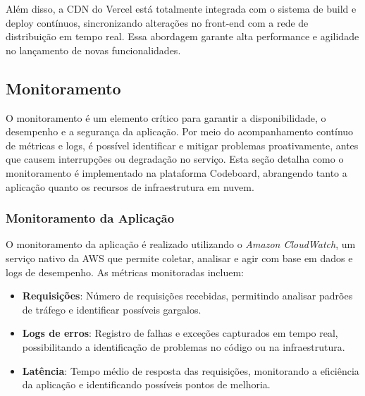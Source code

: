 Além disso, a CDN do Vercel está totalmente integrada com o sistema de build e deploy contínuos, sincronizando alterações no front-end com a rede de distribuição em tempo real. Essa abordagem garante alta performance e agilidade no lançamento de novas funcionalidades.


\subsection{Monitoramento}


O monitoramento é um elemento crítico para garantir a disponibilidade, o desempenho e a segurança da aplicação. Por meio do acompanhamento contínuo de métricas e logs, é possível identificar e mitigar problemas proativamente, antes que causem interrupções ou degradação no serviço. Esta seção detalha como o monitoramento é implementado na plataforma Codeboard, abrangendo tanto a aplicação quanto os recursos de infraestrutura em nuvem.

\subsubsection{Monitoramento da Aplicação}


O monitoramento da aplicação é realizado utilizando o \emph{Amazon CloudWatch}, um serviço nativo da AWS que permite coletar, analisar e agir com base em dados e logs de desempenho. As métricas monitoradas incluem:

\begin{itemize}
    \item \textbf{Requisições}: Número de requisições recebidas, permitindo analisar padrões de tráfego e identificar possíveis gargalos.
    \item \textbf{Logs de erros}: Registro de falhas e exceções capturados em tempo real, possibilitando a identificação de problemas no código ou na infraestrutura.
    \item \textbf{Latência}: Tempo médio de resposta das requisições, monitorando a eficiência da aplicação e identificando possíveis pontos de melhoria.
\end{itemize}

